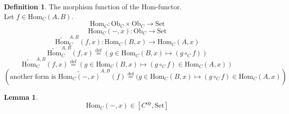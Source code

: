 \documentclass[10pt,a4paper]{article}
\theoremstyle{definition}
\newtheorem{definition}{Definition}[section]
\newtheorem{lemma}{Lemma}[section]
\newcommand{\Ob}{{\mbox{Ob}}}
\newcommand{\Hom}{{\mbox{Hom}}}
\newcommand{\HomMor}{{\widetilde{\Hom}\mbox{}}}
\newcommand{\op}{{\mbox{op}}}
\newcommand{\defi}{{\mbox{def}}}
\newcommand{\eqdef}{{\stackrel{\defi}{=}}}
\newcommand{\Set}{{\mbox{Set}}}
\begin{document}
\begin{definition} The morphism function of the Hom-functor.\\
Let $f\in\Hom_{C}(A,B)$.
$$\Hom_C: \Ob_C \times \Ob_C \to \Set$$
$$\Hom_C(-,x): \Ob_C \to \Set$$
$$\HomMor^{A,B}_C(f,x) : \Hom_C(B,x) \to \Hom_C(A,x)$$
$$\HomMor^{A,B}_C(f,x) \eqdef (g \in\Hom_C(B,x) \mapsto (g \circ_C f))$$
$$\HomMor^{A,B}_C(f,x) \eqdef (g \in\Hom_C(B,x) \mapsto (g \circ_C f) \in\Hom_C(A,x))$$
$$\left(\mbox{another form is }\widetilde{\Hom_C(-,x)}^{A,B}(f) \eqdef (g \in\Hom_C(B,x) \mapsto (g \circ_C f) \in\Hom_C(A,x)\right)$$
\end{definition}

\begin{lemma}
$$\Hom_C(-, x) \in [C^\op,\Set]$$
\end{lemma}
\end{document}
